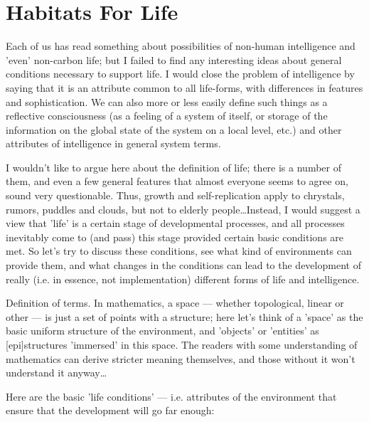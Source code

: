 \section{Habitats For Life}

     Each of us has read something about  possibilities  of  non-human
intelligence  and  'even'  non-carbon  life;  but I failed to find any
interesting ideas about general conditions necessary to support  life.
I  would  close  the  problem  of intelligence by saying that it is an
attribute common to all life-forms, with differences in  features  and
sophistication.  We can also more or less easily define such things as
a reflective consciousness (as a feeling of a  system  of  itself,  or
storage  of  the  information  on  the global state of the system on a
local level, etc.) and other attributes  of  intelligence  in  general
system terms.

     I wouldn't like to argue here about the definition of life; there
is  a  number  of  them,  and  even a few general features that almost
everyone seems to agree on, sound very questionable.  Thus, growth and
self-replication  apply  to chrystals, rumors, puddles and clouds, but
not to elderly people\dots  Instead, I would suggest a view that  'life'
is  a  certain  stage  of  developmental  processes, and all processes
inevitably come to  (and  pass)  this  stage  provided  certain  basic
conditions  are  met.   So  let's try to discuss these conditions, see
what kind of environments can provide them, and what  changes  in  the
conditions  can  lead  to the development of really (i.e.  in essence,
not implementation) different forms of life and intelligence.

     Definition  of  terms.   In  mathematics,  a  space   ---   whether
topological,  linear  or  other  ---  is  just  a  set  of points with a
structure; here  let's  think  of  a  'space'  as  the  basic  uniform
structure   of   the  environment,  and  'objects'  or  'entities'  as
[epi]structures 'immersed' in  this  space.   The  readers  with  some
understanding  of  mathematics can derive stricter meaning themselves,
and those without it won't understand it anyway\dots

     Here are the basic 'life conditions' --- i.e.   attributes  of  the
environment that ensure that the development will go far enough:

